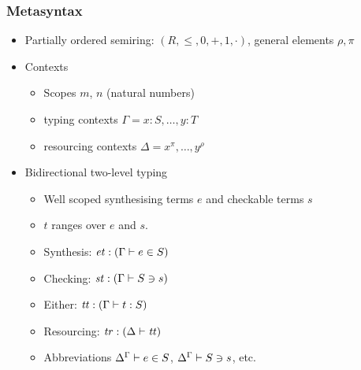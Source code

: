 \documentclass{beamer}
\begin{document}
  \begin{frame}
    \frametitle{Metasyntax}
    \begin{itemize}
    \item Partially ordered semiring: $(R, \leq, 0, +, 1, \cdot)$, general elements $\rho, \pi$ \pause
    \item Contexts
      \begin{itemize}
      \item Scopes $m$, $n$ (natural numbers)
      \item typing contexts $\Gamma = x : S, \ldots, y : T$
      \item resourcing contexts $\Delta = x^\pi, \ldots, y^\rho$ \pause
      \end{itemize}
    \item Bidirectional two-level typing
      \begin{itemize}
      \item Well scoped synthesising terms $e$ and checkable terms $s$
      \item $t$ ranges over $e$ and $s$. \pause
      \item Synthesis: $\mathit{et} : (\Gamma \vdash e \in S)$ \pause
      \item Checking: $\mathit{st} : (\Gamma \vdash S \ni s)$ \pause
      \item Either: $\mathit{tt} : (\Gamma \vdash t : S)$ \pause
      \item Resourcing: $\mathit{tr} : (\Delta \vdash \mathit{tt})$ \pause
      \item Abbreviations ${\Delta}^{\Gamma} \vdash e \in S$,
        ${\Delta}^{\Gamma} \vdash S \ni s$, etc. \pause
      \end{itemize}
    \end{itemize}
  \end{frame}
\end{document}

